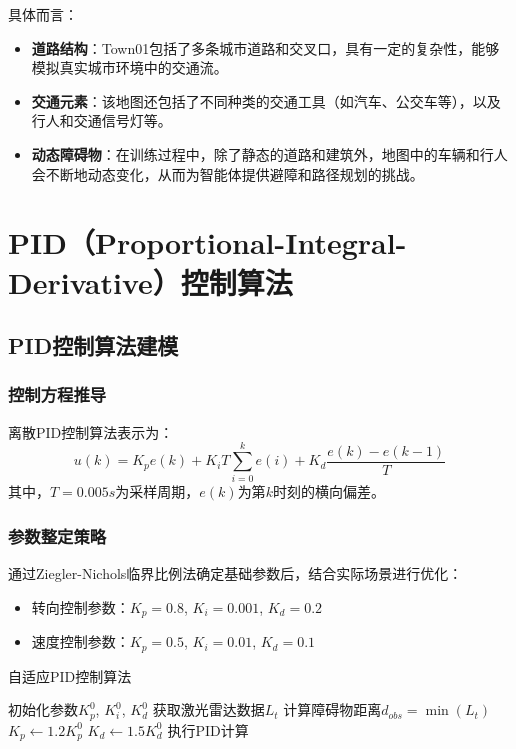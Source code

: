 具体而言：
\begin{itemize}
    \item \textbf{道路结构}：Town01包括了多条城市道路和交叉口，具有一定的复杂性，能够模拟真实城市环境中的交通流。
    \item \textbf{交通元素}：该地图还包括了不同种类的交通工具（如汽车、公交车等），以及行人和交通信号灯等。
    \item \textbf{动态障碍物}：在训练过程中，除了静态的道路和建筑外，地图中的车辆和行人会不断地动态变化，从而为智能体提供避障和路径规划的挑战。
\end{itemize}

\section{PID（Proportional-Integral-Derivative）控制算法}

\subsection{PID控制算法建模}

\subsubsection{控制方程推导}
离散PID控制算法表示为：
\begin{equation}
	u(k) = K_p e(k) + K_i T \sum_{i=0}^k e(i) + K_d \frac{e(k)-e(k-1)}{T}
\end{equation}
其中，$T=0.005s$为采样周期，$e(k)$为第$k$时刻的横向偏差。

\subsubsection{参数整定策略}
通过Ziegler-Nichols临界比例法确定基础参数后，结合实际场景进行优化：
\begin{itemize}
	\item 转向控制参数：$K_p=0.8$, $K_i=0.001$, $K_d=0.2$
	\item 速度控制参数：$K_p=0.5$, $K_i=0.01$, $K_d=0.1$
\end{itemize}

\begin{algorithm}[H]
	\caption{自适应PID控制算法}
	\begin{algorithmic}[1]
	\STATE 初始化参数$K_p^0$, $K_i^0$, $K_d^0$  %
 	\STATE 获取激光雷达数据$L_t$
  	\STATE 计算障碍物距离$d_{obs} = \min(L_t)$
    	\STATE $K_p \gets 1.2K_p^0$
    	\STATE $K_d \gets 1.5K_d^0$
  	\ENDIF
  	\STATE 执行PID计算
	\ENDWHILE
	\end{algorithmic}
\end{algorithm}

